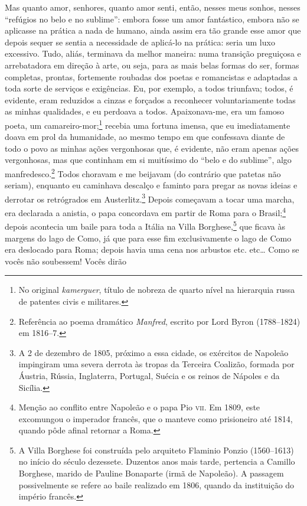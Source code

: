 Mas quanto amor, senhores, quanto amor senti, então, nesses meus sonhos,
nesses “refúgios no belo e no sublime”: embora fosse um amor
fantástico, embora não se aplicasse na prática a nada de humano, ainda
assim era tão grande esse amor que depois sequer se sentia a
necessidade de aplicá-lo na prática: seria um luxo excessivo. Tudo,
aliás, terminava da melhor maneira: numa transição preguiçosa e
arrebatadora em direção à arte, ou seja, para as mais belas formas do
ser, formas completas, prontas, fortemente roubadas dos poetas e
romancistas e adaptadas a toda sorte de serviços e exigências. Eu, por
exemplo, a todos triunfava; todos, é evidente, eram reduzidos a cinzas
e forçados a reconhecer voluntariamente todas as minhas qualidades, e
eu perdoava a todos. Apaixonava-me, era um famoso poeta, um
camareiro-mor;\footnote{ No original \textit{kamerguer}, título de
nobreza de quarto nível na hierarquia russa de patentes civis e militares.}
recebia uma fortuna imensa, que eu imediatamente doava em prol da
humanidade, ao mesmo tempo em que confessava diante de todo o povo as
minhas ações vergonhosas que, é evidente, não eram apenas ações
vergonhosas, mas que continham em si muitíssimo do “belo e do sublime”,
algo manfredesco.\footnote{ Referência ao poema dramático
\textit{Manfred}, escrito por Lord Byron (1788--1824) em 1816--7.} Todos
choravam e me beijavam (do contrário que patetas não seriam), enquanto
eu caminhava descalço e faminto para pregar as novas ideias e derrotar
os retrógrados em Austerlitz.\footnote{ A 2 de dezembro de 1805,
próximo a essa cidade, os exércitos de Napoleão impingiram uma
severa derrota às tropas da Terceira Coalizão, formada por Áustria,
Rússia, Inglaterra, Portugal, Suécia e os reinos de Nápoles e da
Sicília.} Depois começavam a tocar uma marcha, era declarada a anistia,
o papa concordava em partir de Roma para o Brasil;\footnote{ Menção ao
conflito entre Napoleão e o papa Pio \textsc{vii}. Em 1809, este excomungou o
imperador francês, que o manteve como prisioneiro até 1814, quando pôde
afinal retornar a Roma.} depois acontecia um baile para toda a Itália
na Villa Borghese,\footnote{ A Villa Borghese foi construída pelo
arquiteto Flaminio Ponzio (1560--1613) no início do século dezessete.
Duzentos anos mais tarde, pertencia a Camillo Borghese, marido de
Pauline Bonaparte (irmã de Napoleão). A passagem possivelmente se
refere ao baile realizado em 1806, quando da instituição do império
francês.} que ficava às margens do lago de Como, já que para esse fim
exclusivamente o lago de Como era deslocado para Roma; depois havia uma
cena nos arbustos etc. etc\ldots{} Como se vocês não soubessem! Vocês dirão
